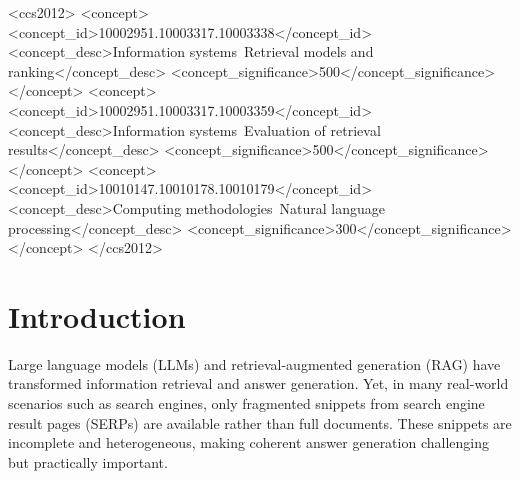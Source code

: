 \documentclass[manuscript,screen]{acmart}
\begin{document}
\begin{CCSXML}
\begin{CCSXML}
<ccs2012>
   <concept>
       <concept_id>10002951.10003317.10003338</concept_id>
       <concept_desc>Information systems~Retrieval models and ranking</concept_desc>
       <concept_significance>500</concept_significance>
       </concept>
   <concept>
       <concept_id>10002951.10003317.10003359</concept_id>
       <concept_desc>Information systems~Evaluation of retrieval results</concept_desc>
       <concept_significance>500</concept_significance>
       </concept>
   <concept>
       <concept_id>10010147.10010178.10010179</concept_id>
       <concept_desc>Computing methodologies~Natural language processing</concept_desc>
       <concept_significance>300</concept_significance>
       </concept>
 </ccs2012>
\end{CCSXML}




\maketitle

\section{Introduction}
\label{sec:introduction}

Large language models (LLMs) and retrieval-augmented generation (RAG) have transformed information retrieval and answer generation. Yet, in many real-world scenarios such as search engines, only fragmented snippets from search engine result pages (SERPs) are available rather than full documents. These snippets are incomplete and heterogeneous, making coherent answer generation challenging but practically important.


\end{CCSXML}
\end{document}
